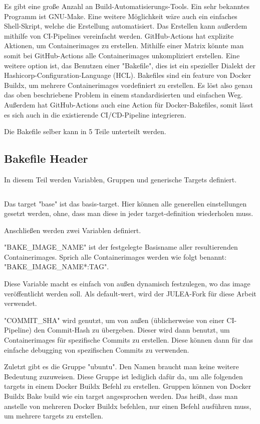 Es gibt eine große Anzahl an Build-Automatisierungs-Tools. Ein sehr bekanntes Programm ist GNU-Make. Eine weitere Möglichkeit wäre auch ein einfaches Shell-Skript, welche die Erstellung automatisiert. Das Erstellen kann außerdem mithilfe von CI-Pipelines vereinfacht werden. GitHub-Actions hat explizite Aktionen, um Containerimages zu erstellen. Mithilfe einer Matrix könnte man somit bei GitHub-Actions alle Containerimages unkompliziert erstellen. Eine weitere option ist, das Benutzen einer "Bakefile", dies ist ein spezieller Dialekt der Hashicorp-Configuration-Language (HCL). Bakefiles sind ein feature von Docker Buildx, um mehrere Containerimages vordefiniert zu erstellen. Es löst also genau das oben beschriebene Problem in einem standardisierten und einfachen Weg. Außerdem hat GitHub-Actions auch eine Action für Docker-Bakefiles, somit lässt es sich auch in die existierende CI/CD-Pipeline integrieren. 

Die Bakefile selber kann in 5 Teile unterteilt werden.

\subsection{Bakefile Header}

In diesem Teil werden Variablen, Gruppen und generische Targets definiert.
\inputminted[firstline=1,lastline=7]{./lexers/docker-bake-lexer.py}{./code-examples/docker-bake.hcl}

Das target "base" ist das basis-target. Hier können alle generellen einstellungen gesetzt werden, ohne, dass man diese in jeder target-definition wiederholen muss. 

Anschließen werden zwei Variablen definiert. 

"BAKE\_IMAGE\_NAME" ist der festgelegte Basisname aller resultierenden Containerimages. Sprich alle Containerimages werden wie folgt benannt: "BAKE\_IMAGE\_NAME*:TAG".

Diese Variable macht es einfach von außen dynamisch festzulegen, wo das image veröffentlicht werden soll. Als default-wert, wird der JULEA-Fork für diese Arbeit verwendet.

"COMMIT\_SHA" wird genutzt, um von außen (üblicherweise von einer CI-Pipeline) den Commit-Hash zu übergeben. Dieser wird dann benutzt, um Containerimages für spezifische Commits zu erstellen. Diese können dann für das einfache debugging von spezifischen Commits zu verwenden.

Zuletzt gibt es die Gruppe "ubuntu". Den Namen braucht man keine weitere Bedeutung zuzuweisen. Diese Gruppe ist lediglich dafür da, um alle folgenden targets in einem Docker Buildx Befehl zu erstellen. Gruppen können von Docker Buildx Bake build wie ein target angesprochen werden. Das heißt, dass man anstelle von mehreren Docker Buildx befehlen, nur einen Befehl ausführen muss, um mehrere targets zu erstellen.

